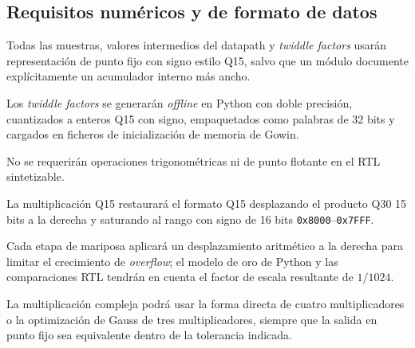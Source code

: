 \documentclass[11pt,a4paper]{article}
\begin{document}
\subsection{Requisitos numéricos y de formato de datos}
\begin{description}[leftmargin=4.2em,style=nextline]
  \item[NUM-1:] Todas las muestras, valores intermedios del datapath y
    \emph{twiddle factors} usarán representación de punto fijo con signo estilo
    Q15, salvo que un módulo documente explícitamente un acumulador interno más
    ancho.
  \item[NUM-2:] Los \emph{twiddle factors} se generarán \emph{offline} en Python
    con doble precisión, cuantizados a enteros Q15 con signo, empaquetados como
    palabras de 32 bits y cargados en ficheros de inicialización de memoria de
    Gowin.
  \item[NUM-3:] No se requerirán operaciones trigonométricas ni de punto flotante
    en el RTL sintetizable.
  \item[NUM-4:] La multiplicación Q15 restaurará el formato Q15 desplazando el
    producto Q30 15 bits a la derecha y saturando al rango con signo de 16 bits
    \texttt{0x8000}--\texttt{0x7FFF}.
  \item[NUM-5:] Cada etapa de mariposa aplicará un desplazamiento aritmético a la
    derecha para limitar el crecimiento de \emph{overflow}; el modelo de oro de
    Python y las comparaciones RTL tendrán en cuenta el factor de escala
    resultante de $1/1024$.
  \item[NUM-6:] La multiplicación compleja podrá usar la forma directa de cuatro
    multiplicadores o la optimización de Gauss de tres multiplicadores, siempre
    que la salida en punto fijo sea equivalente dentro de la tolerancia indicada.
\end{description}
\end{document}
